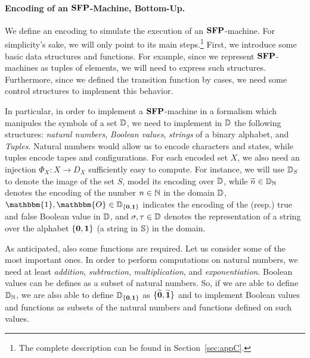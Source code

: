 \begin{conditional}{\shortonly}
  \paragraph{Encoding of an $\mathbf{SFP}$-Machine, Bottom-Up.}\label{sec:SFP2}
  We define an encoding
  to simulate the execution of an $\mathbf{SFP}$-machine.
  For simplicity's sake, we will only
  point to its main steps.\footnote{The
  complete description can be found in Section~\ref{sec:appC}.}
  First, we introduce
  some basic data structures
  and functions.
  For example, since we represent
  $\mathbf{SFP}$-machines
  as tuples of elements,
  we will need to express such structures.
  Furthermore, since we defined
  the transition function by cases,
  we need some control structures
  to implement this behavior.

  In particular, in order to implement a
  $\mathbf{SFP}$-machine
  in a formalism
  which manipules the symbols of a set $\mathbb{D}$,
  we need to implement
  in $\mathbb{D}$ the following structures:
  \emph{natural numbers},
  \emph{Boolean values},
  \emph{strings} of a binary alphabet,
  and \emph{Tuples}.
  Natural numbers would
  allow us to encode characters
  and states, while
  tuples encode tapes and configurations.
  For each encoded set $X$, we also need an injection
  $\Phi_X : X \longrightarrow D_X$ sufficiently easy to compute.
  For instance, we will use $\mathbb{D}_S$ to denote the image of the set $S$,
  model its encoding over $\mathbb{D}$, while
  $\widetilde{n} \in \mathbb{D}_{\mathbb{N}}$
  denotes the encoding of the number $n\in \mathbb{N}$
  in the domain $\mathbb{D}$,
  $\mathbbm{1},
  \mathbbm{O} \in \Dd_{\{\zzero,\oone\}}$
  indicates the encoding of the (resp.) true
  and false Boolean value
  in $\mathbb{D}$, and
  $\sigma,\tau\in \mathbb{D}$ denotes
  the representation of a string over the
  alphabet $\{\mathbf{0},\mathbf{1}\}$ (a string in
  $\mathbb{S}$) in the domain. %

  As anticipated, also some functions are
  required.
  Let us consider some of the most important ones.
  In order
  to perform computations on
  natural numbers,
  we need at least
  \emph{addition},
  \emph{subtraction},
  \emph{multiplication}, and
  \emph{exponentiation}.
  Boolean values can be defines as a subset
  of natural numbers.
  So, if we are able to define $\mathbb{D}_{\mathbb{N}}$,
  we are also able to define $\mathbb{D}_{\{\mathbf{0},\mathbf{1}\}}$
  as $\{\widetilde{\mathbf{0}},\widetilde{\mathbf{1}}\}$
  and to implement
  Boolean values and functions as
  subsets of the natural numbers and functions
  defined on such values.


\end{conditional}
